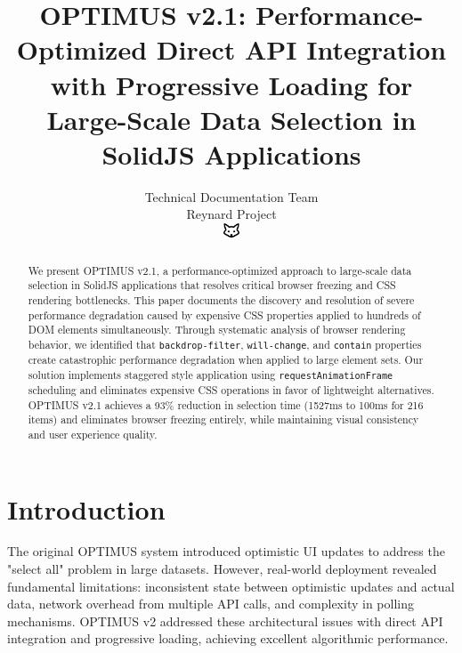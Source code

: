 \documentclass[10pt]{article}
\begin{document}
\title{OPTIMUS v2.1: Performance-Optimized Direct API Integration with Progressive Loading for Large-Scale Data Selection in SolidJS Applications}

\author{Technical Documentation Team\\
Reynard Project\\
\includegraphics[width=0.5cm]{../../shared-assets/favicon.pdf}}

\maketitle

\begin{abstract}
We present OPTIMUS v2.1, a performance-optimized approach to large-scale data selection in SolidJS applications that resolves critical browser freezing and CSS rendering bottlenecks. This paper documents the discovery and resolution of severe performance degradation caused by expensive CSS properties applied to hundreds of DOM elements simultaneously. Through systematic analysis of browser rendering behavior, we identified that \texttt{backdrop-filter}, \texttt{will-change}, and \texttt{contain} properties create catastrophic performance degradation when applied to large element sets. Our solution implements staggered style application using \texttt{requestAnimationFrame} scheduling and eliminates expensive CSS operations in favor of lightweight alternatives. OPTIMUS v2.1 achieves a 93\% reduction in selection time (1527ms to 100ms for 216 items) and eliminates browser freezing entirely, while maintaining visual consistency and user experience quality.
\end{abstract}

\section{Introduction}

The original OPTIMUS system introduced optimistic UI updates to address the "select all" problem in large datasets. However, real-world deployment revealed fundamental limitations: inconsistent state between optimistic updates and actual data, network overhead from multiple API calls, and complexity in polling mechanisms. OPTIMUS v2 addressed these architectural issues with direct API integration and progressive loading, achieving excellent algorithmic performance.
\end{document}

